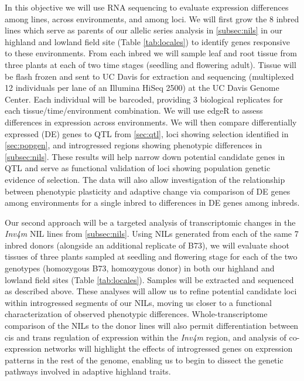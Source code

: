 In this objective we will use RNA sequencing to evaluate expression differences among lines, across environments, and among loci.  We will first grow the 8 inbred lines which serve as parents of our allelic series analysis in \ref{subsec:nils} in our highland and lowland field site (Table \ref{tab:locales})  to identify genes responsive to these environments.  From each inbred we will sample leaf and root tissue from three plants at each of two time stages (seedling and flowering adult). Tissue will be flash frozen and sent to UC Davis for extraction and sequencing (multiplexed 12 individuals per lane of an Illumina HiSeq 2500) at the UC Davis Genome Center. Each individual will be barcoded, providing 3 biological replicates for each tissue/time/environment combination. We will use edgeR \citep{robinson2010edger} to assess differences in expression across environments.  We will then compare differentially expressed (DE) genes to QTL from \ref{sec:qtl}, loci showing selection identified in \ref{sec:popgen}, and introgressed regions showing phenotypic differences in \ref{subsec:nils}.   These results will help narrow down potential candidate genes in QTL and serve as functional validation of loci showing population genetic evidence of selection.  The data will also allow investigation of the relationship between phenotypic plasticity and adaptive change \citep[c.f.][]{Rosas26082013} via comparison of DE genes among environments for a single inbred to differences in DE genes among inbreds.  

Our second approach will be a targeted analysis of transcriptomic changes in the \emph{Inv4m} NIL lines from \ref{subsec:nils}.  Using NILs generated from each of the same 7 inbred donors (alongside an additional replicate of B73), we will evaluate shoot tissues of three plants sampled at seedling and flowering stage for each of the two genotypes (homozygous B73, homozygous donor) in both our highland and lowland field sites (Table \ref{tab:locales}).  Samples will be extracted and sequenced as described above. These analyses will allow us to refine potential candidate loci within introgressed segments of our NILs, moving us closer to a functional characterization of observed phenotypic differences. Whole-transcriptome comparison of the NILs to the donor lines will also permit differentiation between cis and trans regulation of expression within the \emph{Inv4m}  region, and analysis of co-expression networks \citep[c.f.][]{Swanson-Wagner02072012} will highlight the effects of introgressed genes on expression patterns in the rest of the genome, enabling us to begin to dissect the genetic pathways involved in adaptive highland traits.

